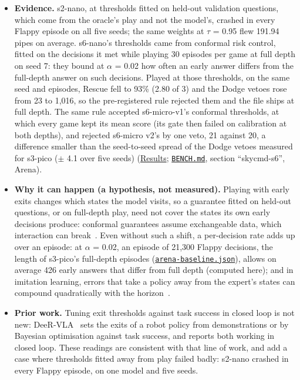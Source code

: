 \documentclass[10pt]{article}
\begin{document}
\begin{itemize}
\item \textbf{Evidence.} s2-nano, at thresholds fitted on held-out validation questions, which come from the oracle's play and not the model's, crashed in every Flappy episode on all five seeds; the same weights at $\tau$ = 0.95 flew 191.94 pipes on average. s6-nano's thresholds came from conformal risk control, fitted on the decisions it met while playing 30 episodes per game at full depth on seed 7: they bound at $\alpha$ = 0.02 how often an early answer differs from the full-depth answer on such decisions. Played at those thresholds, on the same seed and episodes, Rescue fell to 93\% (2.80 of 3) and the Dodge vetoes rose from 23 to 1,016, so the pre-registered rule rejected them and the file ships at full depth. The same rule accepted s6-micro-v1's conformal thresholds, at which every game kept its mean score (its gate then failed on calibration at both depths), and rejected s6-micro v2's by one veto, 21 against 20, a difference smaller than the seed-to-seed spread of the Dodge vetoes measured for s3-pico ($\pm$ 4.1 over five seeds) (\href{https://maxgfr.github.io/skycmd/results/\#s6-micro-v2-passed-on-a-second-look}{Results}; \href{https://github.com/maxgfr/skycmd/blob/main/BENCH.md}{\texttt{BENCH.md}}, section ``skycmd-s6'', Arena).
\item \textbf{Why it can happen (a hypothesis, not measured).} Playing with early exits changes which states the model visits, so a guarantee fitted on held-out questions, or on full-depth play, need not cover the states its own early decisions produce: conformal guarantees assume exchangeable data, which interaction can break~\cite{mirzaeedodangeh2025safe}. Even without such a shift, a per-decision rate adds up over an episode: at $\alpha$ = 0.02, an episode of 21,300 Flappy decisions, the length of s3-pico's full-depth episodes (\href{https://github.com/maxgfr/skycmd/blob/main/runs/s6-sleep3/gate/arena-baseline.json}{\texttt{arena-baseline.json}}), allows on average 426 early answers that differ from full depth (computed here); and in imitation learning, errors that take a policy away from the expert's states can compound quadratically with the horizon~\cite{ross2010efficient}.
\item \textbf{Prior work.} Tuning exit thresholds against task success in closed loop is not new: DeeR-VLA~\cite{yue2024deer} sets the exits of a robot policy from demonstrations or by Bayesian optimisation against task success, and reports both working in closed loop. These readings are consistent with that line of work, and add a case where thresholds fitted away from play failed badly: s2-nano crashed in every Flappy episode, on one model and five seeds.

\end{itemize}
\end{document}
